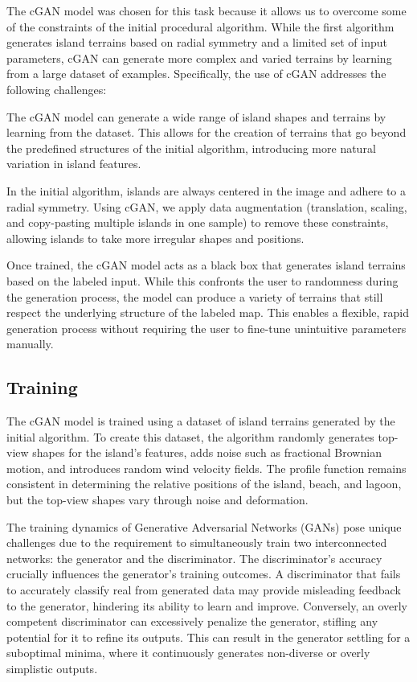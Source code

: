 The cGAN model was chosen for this task because it allows us to overcome some of the constraints of the initial procedural algorithm. While the first algorithm generates island terrains based on radial symmetry and a limited set of input parameters, cGAN can generate more complex and varied terrains by learning from a large dataset of examples. Specifically, the use of cGAN addresses the following challenges:
\begin{Itemize}
     The cGAN model can generate a wide range of island shapes and terrains by learning from the dataset. This allows for the creation of terrains that go beyond the predefined structures of the initial algorithm, introducing more natural variation in island features.

     In the initial algorithm, islands are always centered in the image and adhere to a radial symmetry. Using cGAN, we apply data augmentation (translation, scaling, and copy-pasting multiple islands in one sample) to remove these constraints, allowing islands to take more irregular shapes and positions.

     Once trained, the cGAN model acts as a black box that generates island terrains based on the labeled input. While this confronts the user to randomness during the generation process, the model can produce a variety of terrains that still respect the underlying structure of the labeled map. This enables a flexible, rapid generation process without requiring the user to fine-tune unintuitive parameters manually.
\end{Itemize}


\subsection{Training}

The cGAN model is trained using a dataset of island terrains generated by the initial algorithm. To create this dataset, the algorithm randomly generates top-view shapes for the island's features, adds noise such as fractional Brownian motion, and introduces random wind velocity fields. The profile function remains consistent in determining the relative positions of the island, beach, and lagoon, but the top-view shapes vary through noise and deformation.

The training dynamics of Generative Adversarial Networks (GANs) pose unique challenges due to the requirement to simultaneously train two interconnected networks: the generator and the discriminator. The discriminator's accuracy crucially influences the generator's training outcomes. A discriminator that fails to accurately classify real from generated data may provide misleading feedback to the generator, hindering its ability to learn and improve. Conversely, an overly competent discriminator can excessively penalize the generator, stifling any potential for it to refine its outputs. This can result in the generator settling for a suboptimal minima, where it continuously generates non-diverse or overly simplistic outputs.

